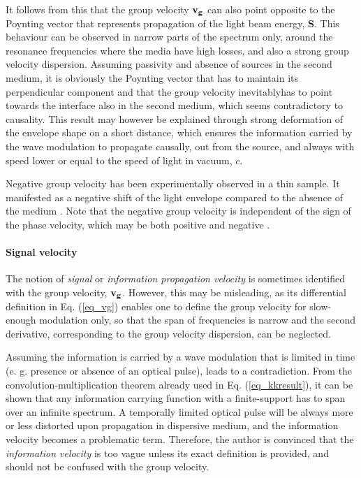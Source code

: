 It follows from this that the group velocity ${\mathbf{v_g}}$ can also point opposite to the Poynting vector that represents propagation of the light beam energy, $\mathbf{S}$. 
This behaviour can be observed in narrow parts of the spectrum only, around the resonance frequencies where the media have high losses, and also a strong group velocity dispersion.
Assuming passivity and absence of sources in the second medium, it is obviously the Poynting vector that has to maintain its perpendicular component and that the group velocity   inevitablyhas to point towards the interface also in the second medium, which seems contradictory to causality.
This result 
may however be explained through strong deformation of the envelope shape on a short distance, which ensures the information carried by the wave modulation to propagate causally, out from the source, and always with speed lower or equal to the speed of light in vacuum, $c$.

Negative group velocity has been experimentally observed in a thin sample. It manifested as a negative shift of the light envelope compared to the absence of the medium \cite{dolling2006simultaneous}. Note that the negative group velocity is independent of the sign of the phase velocity, which may be both positive and negative \cite{mikki2009electromagnetic}.

\paragraph{Signal velocity}%
The notion of \textit{signal} or \textit{information propagation velocity} is sometimes %
identified with the group velocity, ${\mathbf{v_g}}$. However, this may be misleading, as its differential definition in Eq. (\ref{eq_vg}) enables one to define the group velocity for slow-enough modulation only, so that the span of frequencies is narrow and the second derivative, corresponding to the group velocity dispersion, can be neglected.

Assuming the information is carried by a wave modulation that is limited in time (e. g. presence or absence of an optical pulse), leads to a contradiction. From the convolution-multiplication theorem already used in Eq. (\ref{eq_kkresult}), it can be shown that any information carrying function with a finite-support has to span over an infinite spectrum. 
A temporally limited optical pulse will be always more or less distorted upon propagation in dispersive medium, and the information velocity becomes a problematic term.
Therefore, the author is convinced that the \textit{information velocity} is too vague unless its exact definition is provided, and should not be confused with the group velocity. 

